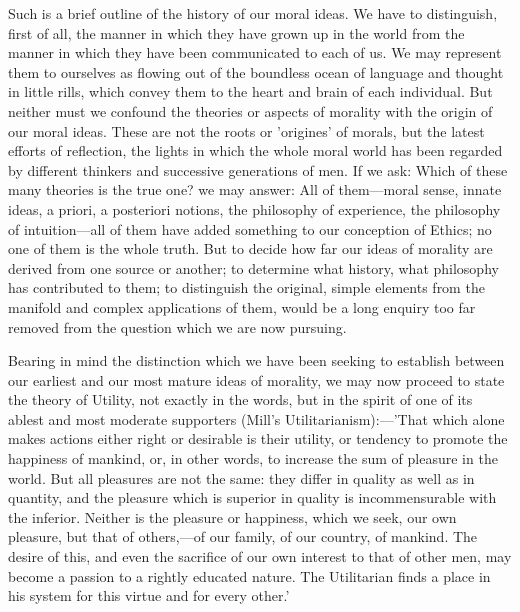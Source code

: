 \documentclass[11pt,letter]{article}
\begin{document}
\par  Such is a brief outline of the history of our moral ideas. We have to distinguish, first of all, the manner in which they have grown up in the world from the manner in which they have been communicated to each of us. We may represent them to ourselves as flowing out of the boundless ocean of language and thought in little rills, which convey them to the heart and brain of each individual. But neither must we confound the theories or aspects of morality with the origin of our moral ideas. These are not the roots or 'origines' of morals, but the latest efforts of reflection, the lights in which the whole moral world has been regarded by different thinkers and successive generations of men. If we ask: Which of these many theories is the true one? we may answer: All of them—moral sense, innate ideas, a priori, a posteriori notions, the philosophy of experience, the philosophy of intuition—all of them have added something to our conception of Ethics; no one of them is the whole truth. But to decide how far our ideas of morality are derived from one source or another; to determine what history, what philosophy has contributed to them; to distinguish the original, simple elements from the manifold and complex applications of them, would be a long enquiry too far removed from the question which we are now pursuing.

\par  Bearing in mind the distinction which we have been seeking to establish between our earliest and our most mature ideas of morality, we may now proceed to state the theory of Utility, not exactly in the words, but in the spirit of one of its ablest and most moderate supporters (Mill's Utilitarianism):—'That which alone makes actions either right or desirable is their utility, or tendency to promote the happiness of mankind, or, in other words, to increase the sum of pleasure in the world. But all pleasures are not the same: they differ in quality as well as in quantity, and the pleasure which is superior in quality is incommensurable with the inferior. Neither is the pleasure or happiness, which we seek, our own pleasure, but that of others,—of our family, of our country, of mankind. The desire of this, and even the sacrifice of our own interest to that of other men, may become a passion to a rightly educated nature. The Utilitarian finds a place in his system for this virtue and for every other.'
\end{document}
